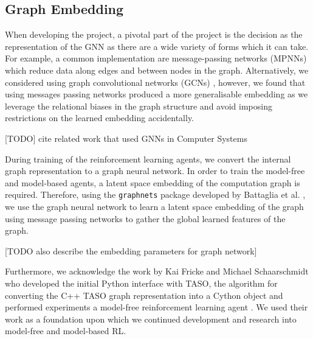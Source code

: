 \subsection{Graph Embedding}
\label{sec:design:subsec:embed}

When developing the project, a pivotal part of the project is the decision as the representation of the GNN as there are a wide variety of forms which it can take. For example, a common implementation are message-passing networks (MPNNs) \cite{gilmer2017neural} which reduce data along edges and between nodes in the graph. Alternatively, we considered using graph convolutional networks (GCNs) \cite{kipf2016semi}, however, we found that using messages passing networks produced a more generalisable embedding as we leverage the relational biases in the graph structure and avoid imposing restrictions on the learned embedding accidentally.

[TODO] cite related work that used GNNs in Computer Systems

During training of the reinforcement learning agents, we convert the internal graph representation to a graph neural network. In order to train the model-free and model-based agents, a latent space embedding of the computation graph is required. Therefore, using the \texttt{graph\textunderscore nets} package developed by Battaglia et al. \cite{battaglia2018relational}, we use the graph neural network to learn a latent space embedding of the graph using message passing networks to gather the global learned features of the graph.

[TODO also describe the embedding parameters for graph network]

Furthermore, we acknowledge the work by Kai Fricke and Michael Schaarschmidt who developed the initial Python interface with TASO, the algorithm for converting the C++ TASO graph representation into a Cython object and performed experiments a model-free reinforcement learning agent \cite{xflowrl2019}. We used their work as a foundation upon which we continued development and research into model-free and model-based RL.
